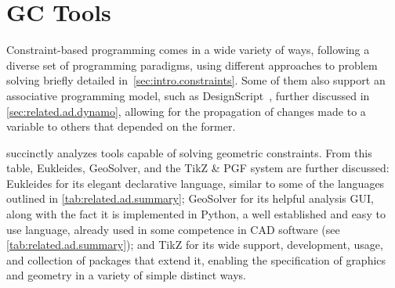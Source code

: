 \section{\acl{GC} Tools}%
\label{sec:related.constraints}

Constraint-based programming comes in a wide variety of ways, following a
diverse set of programming paradigms, using different approaches to problem
solving briefly detailed in~\cref{sec:intro.constraints}.  Some of them also
support an associative programming model, such as
DesignScript~\cite{Aish:2011:DesignScript}, further discussed in
\cref{sec:related.ad.dynamo}, allowing for the propagation of changes made to a
variable to others that depended on the former.

 succinctly analyzes tools capable of
solving geometric constraints.  From this table, Eukleides, GeoSolver, and the
\acs{TikZ} \& \acs{PGF} system are further discussed: Eukleides for its elegant
declarative language, similar to some of the languages outlined in
\cref{tab:related.ad.summary}; GeoSolver for its helpful analysis \ac{GUI},
along with the fact it is implemented in Python, a well established and easy to
use language, already used in some competence in \ac{CAD} software (see
\cref{tab:related.ad.summary}); and \ac{TikZ} for its wide support,
development, usage, and collection of packages that extend it, enabling the
specification of graphics and geometry in a variety of simple distinct ways.

